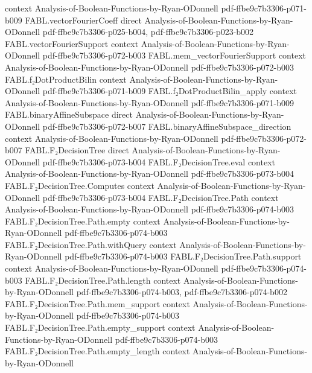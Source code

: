 \begin{theorem}
  {context}
  {Analysis-of-Boolean-Functions-by-Ryan-ODonnell}
  {pdf-ffbe9c7b3306-p071-b009}
\proofstep
  {FABL.vectorFourierCoeff}
  {direct}
  {Analysis-of-Boolean-Functions-by-Ryan-ODonnell}
  {pdf-ffbe9c7b3306-p025-b004,
    pdf-ffbe9c7b3306-p023-b002}
\proofstep
  {FABL.vectorFourierSupport}
  {context}
  {Analysis-of-Boolean-Functions-by-Ryan-ODonnell}
  {pdf-ffbe9c7b3306-p072-b003}
\proofstep
  {FABL.mem_vectorFourierSupport}
  {context}
  {Analysis-of-Boolean-Functions-by-Ryan-ODonnell}
  {pdf-ffbe9c7b3306-p072-b003}
\proofstep
  {FABL.f₂DotProductBilin}
  {context}
  {Analysis-of-Boolean-Functions-by-Ryan-ODonnell}
  {pdf-ffbe9c7b3306-p071-b009}
\proofstep
  {FABL.f₂DotProductBilin_apply}
  {context}
  {Analysis-of-Boolean-Functions-by-Ryan-ODonnell}
  {pdf-ffbe9c7b3306-p071-b009}
\proofstep
  {FABL.binaryAffineSubspace}
  {direct}
  {Analysis-of-Boolean-Functions-by-Ryan-ODonnell}
  {pdf-ffbe9c7b3306-p072-b007}
\proofstep
  {FABL.binaryAffineSubspace_direction}
  {context}
  {Analysis-of-Boolean-Functions-by-Ryan-ODonnell}
  {pdf-ffbe9c7b3306-p072-b007}
\proofstep
  {FABL.F₂DecisionTree}
  {direct}
  {Analysis-of-Boolean-Functions-by-Ryan-ODonnell}
  {pdf-ffbe9c7b3306-p073-b004}
\proofstep
  {FABL.F₂DecisionTree.eval}
  {context}
  {Analysis-of-Boolean-Functions-by-Ryan-ODonnell}
  {pdf-ffbe9c7b3306-p073-b004}
\proofstep
  {FABL.F₂DecisionTree.Computes}
  {context}
  {Analysis-of-Boolean-Functions-by-Ryan-ODonnell}
  {pdf-ffbe9c7b3306-p073-b004}
\proofstep
  {FABL.F₂DecisionTree.Path}
  {context}
  {Analysis-of-Boolean-Functions-by-Ryan-ODonnell}
  {pdf-ffbe9c7b3306-p074-b003}
\proofstep
  {FABL.F₂DecisionTree.Path.empty}
  {context}
  {Analysis-of-Boolean-Functions-by-Ryan-ODonnell}
  {pdf-ffbe9c7b3306-p074-b003}
\proofstep
  {FABL.F₂DecisionTree.Path.withQuery}
  {context}
  {Analysis-of-Boolean-Functions-by-Ryan-ODonnell}
  {pdf-ffbe9c7b3306-p074-b003}
\proofstep
  {FABL.F₂DecisionTree.Path.support}
  {context}
  {Analysis-of-Boolean-Functions-by-Ryan-ODonnell}
  {pdf-ffbe9c7b3306-p074-b003}
\proofstep
  {FABL.F₂DecisionTree.Path.length}
  {context}
  {Analysis-of-Boolean-Functions-by-Ryan-ODonnell}
  {pdf-ffbe9c7b3306-p074-b003,
    pdf-ffbe9c7b3306-p074-b002}
\proofstep
  {FABL.F₂DecisionTree.Path.mem_support}
  {context}
  {Analysis-of-Boolean-Functions-by-Ryan-ODonnell}
  {pdf-ffbe9c7b3306-p074-b003}
\proofstep
  {FABL.F₂DecisionTree.Path.empty_support}
  {context}
  {Analysis-of-Boolean-Functions-by-Ryan-ODonnell}
  {pdf-ffbe9c7b3306-p074-b003}
\proofstep
  {FABL.F₂DecisionTree.Path.empty_length}
  {context}
  {Analysis-of-Boolean-Functions-by-Ryan-ODonnell}

\end{theorem}
